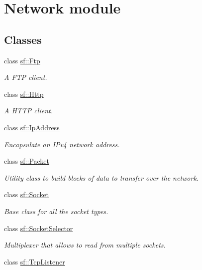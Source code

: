 \hypertarget{group__network}{}\section{Network module}
\label{group__network}
\subsection*{Classes}
\begin{DoxyCompactItemize}
\item 
class \mbox{\hyperlink{classsf_1_1_ftp}{sf\+::\+Ftp}}
\begin{DoxyCompactList}\small\item\em A F\+TP client. \end{DoxyCompactList}\item 
class \mbox{\hyperlink{classsf_1_1_http}{sf\+::\+Http}}
\begin{DoxyCompactList}\small\item\em A H\+T\+TP client. \end{DoxyCompactList}\item 
class \mbox{\hyperlink{classsf_1_1_ip_address}{sf\+::\+Ip\+Address}}
\begin{DoxyCompactList}\small\item\em Encapsulate an I\+Pv4 network address. \end{DoxyCompactList}\item 
class \mbox{\hyperlink{classsf_1_1_packet}{sf\+::\+Packet}}
\begin{DoxyCompactList}\small\item\em Utility class to build blocks of data to transfer over the network. \end{DoxyCompactList}\item 
class \mbox{\hyperlink{classsf_1_1_socket}{sf\+::\+Socket}}
\begin{DoxyCompactList}\small\item\em Base class for all the socket types. \end{DoxyCompactList}\item 
class \mbox{\hyperlink{classsf_1_1_socket_selector}{sf\+::\+Socket\+Selector}}
\begin{DoxyCompactList}\small\item\em Multiplexer that allows to read from multiple sockets. \end{DoxyCompactList}\item 
class \mbox{\hyperlink{classsf_1_1_tcp_listener}{sf\+::\+Tcp\+Listener}}

\end{DoxyCompactItemize}
